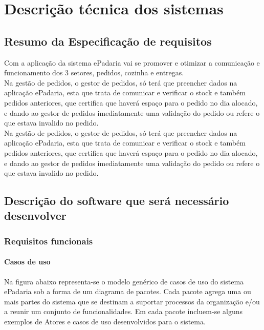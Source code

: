 \chapter{Descrição técnica dos sistemas}
\label{descricao_tecnica_dos_sistemas}

\section{Resumo da Especificação de requisitos}
Com a aplicação da sistema ePadaria vai se promover e otimizar a comunicação e funcionamento dos 3 setores, pedidos, cozinha e entregas.\\
Na gestão de pedidos, o gestor de pedidos, só terá que preencher dados na aplicação ePadaria, esta que trata de comunicar e verificar o stock e também pedidos anteriores, que certifica que haverá espaço para o pedido no dia alocado, e dando ao gestor de pedidos imediatamente uma validação do pedido ou refere o que estava invalido no pedido.\\
Na gestão de pedidos, o gestor de pedidos, só terá que preencher dados na aplicação ePadaria, esta que trata de comunicar e verificar o stock e também pedidos anteriores, que certifica que haverá espaço para o pedido no dia alocado, e dando ao gestor de pedidos imediatamente uma validação do pedido ou refere o que estava invalido no pedido.\\


\section{Descrição do software que será necessário desenvolver}
\subsection{Requisitos funcionais}
\subsubsection{Casos de uso}
Na figura abaixo representa-se o modelo genérico de casos de uso do sistema ePadaria sob a forma de um diagrama de pacotes. Cada pacote agrega uma ou mais partes do sistema que se destinam a suportar processos da organização e/ou a reunir um conjunto de funcionalidades. Em cada pacote incluem-se alguns exemplos de Atores e casos de uso desenvolvidos para o sistema.

